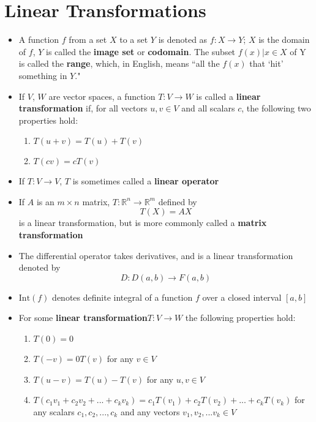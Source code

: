 \documentclass[10pt,letterpaper]{article}
\begin{document}
\section*{Linear Transformations}
\begin{itemize}
\item A function $f$ from a set $X$ to a set $Y$ is denoted as $f : X \to Y$; $X$ is the domain of $f$, $Y$ is called the \textbf{image set }or \textbf{codomain}. The subset ${f(x)| x \in X}$ of Y is called the \textbf{range}, which, in English, means ``all the $f(x)$ that `hit' something in $Y$."

\item If $V$, 	$W$ are vector spaces, a function $T : V \to W$ is called a \textbf{linear transformation} if, for all vectors $u, v \in V$ and all scalars $c$, the following two properties hold: 
\begin{enumerate}
\item $T(u+ v) = T(u) +  T(v)$ 
\item $T(cv) = cT(v)$ 
\end{enumerate}

\item If $T : V \to V$, $T$ is sometimes called a \textbf{linear operator }

\item If $A$ is an $m\times n$ matrix, $T : \mathbb{R}^n \to \mathbb{R}^m $ defined by 
$$T(X) = AX$$ is a linear transformation, but is more commonly called a \textbf{matrix transformation}

\item The differential operator takes derivatives, and is a linear transformation denoted by 
$$ D : D(a, b) \to F(a, b)$$

\item  $\mbox{Int}(f)$ denotes definite integral of a function $f$ over a closed interval $[a,b]$

\item For some \textbf{linear transformation}$T : V \to W$ the following properties hold: 
\begin{enumerate}
\item $T(0)=0$
\item $T(-v)=0T(v) $ for any $v\in V$
\item $T(u-v)=T(u)-T(v)$ for any $u, v \in V$ 
\item $T(c_1v_1+c_2v_2+...+c_kv_k)=c_1T(v_1)+c_2T(v_2)+...+c_kT(v_k)$ for any scalars 
$c_1, c_2,...,c_k$ and any vectors $v_1, v_2,...v_k\in V$
\end{enumerate}


\end{itemize}
\end{document}
